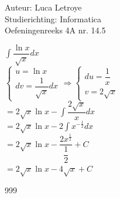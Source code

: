 \documentclass[a4paper]{article}
\begin{document}
  
\noindent \large Auteur: Luca Letroye \\
\noindent \large Studierichting: Informatica\\
\noindent \large Oefeningenreeks 4A nr. 14.5\\

\medskip
\normalsize

$\displaystyle\int \dfrac{\ln x}{\sqrt{x}}dx$\\

$\left\{
\begin{array}{l}
	u=\ln x \\ 
	dv=\dfrac{1}{\sqrt{x}}dx
\end{array}\right.
\Rightarrow 
\left\{
\begin{array}{l}
	du= 	\dfrac{1}{x}\\
 	v=2\sqrt{x}
\end{array}
\right.$\\

$= 2\sqrt{x}\ln x - \displaystyle\int \dfrac{2\sqrt{x}}{x}dx$\\

$= 2\sqrt{x}\ln x - 2\displaystyle\int x^{-\tfrac{1}{2}}dx$\\

$= 2\sqrt{x}\ln x - \dfrac{2x^{\tfrac{1}{2}}}{\dfrac{1}{2}}+C$\\

$= 2\sqrt{x}\ln x - 4\sqrt{x}+C$\\


\begin{thebibliography}{999}
\end{thebibliography}
\end{document}
